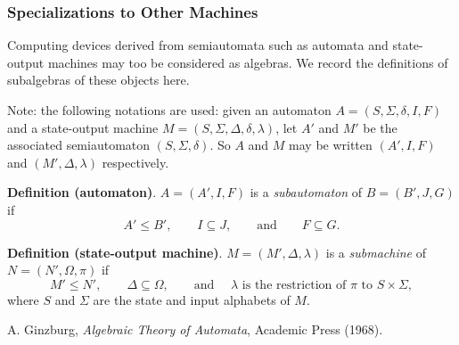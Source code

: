\documentclass[12pt]{article}
\begin{document}
\subsubsection*{Specializations to Other Machines}

Computing devices derived from semiautomata such as automata and state-output machines may too be considered as algebras.  We record the definitions of subalgebras of these objects here.

Note: the following notations are used: given an automaton $A=(S,\Sigma,\delta,I,F)$ and a state-output machine $M=(S,\Sigma,\Delta,\delta,\lambda)$, let $A'$ and $M'$ be the associated semiautomaton $(S,\Sigma,\delta)$.  So $A$ and $M$ may be written $(A',I,F)$ and $(M',\Delta,\lambda)$ respectively.

\textbf{Definition (automaton)}.  $A=(A',I,F)$ is a \emph{subautomaton} of $B=(B',J,G)$ if 
$$A'\le B',\qquad I\subseteq J, \qquad \mbox{and} \qquad F\subseteq G.$$

\textbf{Definition (state-output machine)}.  $M=(M',\Delta,\lambda)$ is a \emph{submachine} of $N=(N',\Omega,\pi)$ if 
$$M'\le N', \qquad \Delta \subseteq \Omega,\qquad \mbox{and } \quad \lambda \mbox{ is the restriction of }\pi\mbox{ to }S\times \Sigma,$$ where $S$ and $\Sigma$ are the state and input alphabets of $M$.

\begin{thebibliography}{8}
 A. Ginzburg, {\em Algebraic Theory of Automata}, Academic Press (1968).
\end{thebibliography}
\end{document}
